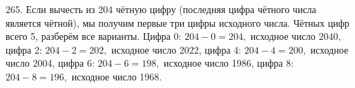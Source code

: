 265. Если вычесть из 204 чётную цифру (последняя цифра чётного числа является чётной), мы получим первые три цифры исходного числа. Чётных цифр всего 5, разберём все варианты. Цифра 0: $204-0=204,$ исходное число $2040,$ цифра 2: $204-2=202,$ исходное число 2022, цифра 4: $204-4=200,$ исходное число 2004, цифра 6: $204-6=198,$ исходное число 1986, цифра 8: $204-8=196,$ исходное число 1968.\\
